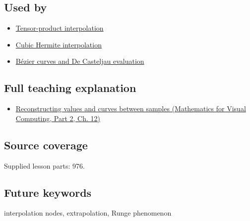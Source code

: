 \subsection{Used by}\label{appendix-0c2a5f69851e-used-by}

\hypertarget{appendix-0c2a5f69851e-used-by}{}

\begin{itemize}
\tightlist
\item
  \hyperref[appendix-0a09b6dfdc86]{Tensor-product interpolation}
\item
  \hyperref[appendix-db3aef8f2fd6]{Cubic Hermite interpolation}
\item
  \hyperref[appendix-ddbec701898c]{Bézier curves and De Casteljau evaluation}
\end{itemize}

\subsection{Full teaching explanation}\label{appendix-0c2a5f69851e-full-teaching-explanation}

\hypertarget{appendix-0c2a5f69851e-full-teaching-explanation}{}

\begin{itemize}
\tightlist
\item
  \href{../02-Mathematics-for-Visual-Computing-P02/main.pdf\#02-foundations-ii-ch028-reconstructing-values-and-curves-between-samples}{Reconstructing values and curves between samples (Mathematics for Visual Computing, Part 2, Ch. 12)}
\end{itemize}

\subsection{Source coverage}\label{appendix-0c2a5f69851e-source-coverage}

\hypertarget{appendix-0c2a5f69851e-source-coverage}{}

Supplied lesson parts: 976.

\subsection{Future keywords}\label{appendix-0c2a5f69851e-future-keywords}

\hypertarget{appendix-0c2a5f69851e-future-keywords}{}

interpolation nodes, extrapolation, Runge phenomenon
